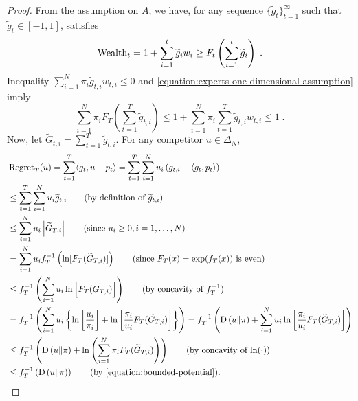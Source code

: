 \begin{proof}
From the assumption on $A$, we have, for any sequence
$\{\widetilde g_t\}_{t=1}^\infty$ such that $\widetilde g_t \in [-1,1]$, satisfies
\begin{equation}
\label{equation:experts-one-dimensional-assumption}
\operatorname{Wealth}_t = 1 + \sum_{i=1}^t \widetilde g_i w_i \ge F_t\left(\sum_{i=1}^t \widetilde g_i\right) \; .
\end{equation}
Inequality $\sum_{i=1}^N \pi_i \widetilde g_{t,i} w_{t,i} \le 0$ and \eqref{equation:experts-one-dimensional-assumption} imply
\begin{equation}
\label{equation:bounded-potential}
\sum_{i=1}^N  \pi_i F_T \left(\sum_{t=1}^T \widetilde g_{t,i} \right)
\le 1 + \sum_{i=1}^N \pi_i \sum_{t=1}^T  \widetilde g_{t,i} w_{t,i} \le 1 \; .
\end{equation}
Now, let $\widetilde G_{t,i} =
\sum_{t=1}^T \widetilde g_{t,i}$. For any competitor $u \in \Delta_N$,
\begingroup
\allowdisplaybreaks
\begin{align*}
\allowdisplaybreaks
&\Regret_T(u)
= \sum_{t=1}^T \langle g_t, u - p_t \rangle
= \sum_{t=1}^T \sum_{i=1}^N u_i \left(g_{t,i} - \langle g_t, p_t \rangle \right) \\
& \le \sum_{t=1}^T \sum_{i=1}^N u_i \widetilde g_{t,i} \qquad \text{(by definition of $\widetilde g_{t,i}$)} \\
& \le \sum_{i=1}^N u_i \left|\widetilde G_{T,i}\right| \qquad \text{(since $u_i \ge 0, i=1,\ldots,N$)}  \\
& = \sum_{i=1}^N u_i f_T^{-1}\left(\ln [F_T(\widetilde G_{T,i})] \right)  \qquad \text{(since $F_T(x) = \exp(f_T(x))$ is even)} \\
& \le f_T^{-1}\left(\sum_{i=1}^N u_i \ln \left[ F_T(\widetilde G_{T,i}) \right]\right) \qquad \text{(by concavity of $f_T^{-1}$)} \\
& = f_T^{-1}\left(\sum_{i=1}^N u_i \left\{\ln \left[\frac{u_i}{\pi_i}\right] +\ln \left[ \frac{\pi_i}{u_i} F_T(\widetilde G_{T,i}) \right] \right\} \right)
= f_T^{-1}\left(\KL{u}{\pi}+\sum_{i=1}^N u_i\ln \left[\frac{\pi_i}{u_i} F_T(\widetilde G_{T,i}) \right]\right) \\
& \le f_T^{-1}\left(\KL{u}{\pi}+\ln \left(\sum_{i=1}^N \pi_i F_T(\widetilde G_{T,i}) \right)\right) \qquad \text{(by concavity of $\ln(\cdot)$)} \\
& \le f_T^{-1}\left(\KL{u}{\pi}\right) \qquad \text{(by \eqref{equation:bounded-potential})}.
\end{align*}
\endgroup
\end{proof}
